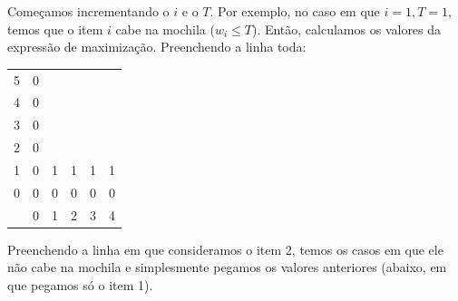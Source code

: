 \begin{example}
	Começamos incrementando o $i$ e o $T$. Por exemplo, no caso em que  $i=1, T=1$, temos que o item $i$ cabe na mochila ($w_i \leq T$). Então, calculamos os valores da expressão de maximização. Preenchendo a linha toda:

	\begin{center}
		\begin{tabular}{c|c|c|c|c|c|}
			\cline{2-6}
			5                                              & 0                     &                       &                       &                       &                       \\ \cline{2-6}
			4                                              & 0                     &                       &                       &                       &                       \\ \cline{2-6}
			3                                              & 0                     &                       &                       &                       &                       \\ \cline{2-6}
			2                                              & 0                     &                       &                       &                       &                       \\ \cline{2-6}
			1                                              & 0                     & 1                     & 1                     & 1                     & 1                     \\ \cline{2-6}
			0                                              & 0                     & 0                     & 0                     & 0                     & 0                     \\ \cline{2-6}
			\multicolumn{1}{c}{\diagbox[dir=NE]{$i$}{$T$}} & \multicolumn{1}{c}{0} & \multicolumn{1}{c}{1} & \multicolumn{1}{c}{2} & \multicolumn{1}{c}{3} & \multicolumn{1}{c}{4}
		\end{tabular}
	\end{center}

	Preenchendo a linha em que consideramos o item 2, temos os casos em que ele não cabe na mochila e simplesmente pegamos os valores anteriores (abaixo, em que pegamos só o item 1).


\end{example}

